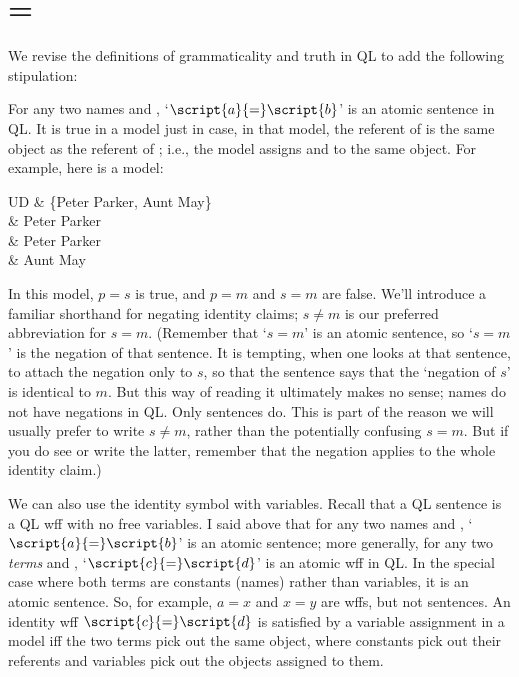 \section{=}

We revise the definitions of grammaticality and truth in QL to add the following stipulation:

For any two names  and , `$\script{a}{=}\script{b}$' is an atomic sentence in QL. It is true in a model just in case, in that model, the referent of  is the same object as the referent of ; i.e., the model assigns  and  to the same object. For example, here is a model:

\begin{partialmodel}
	UD & \{Peter Parker, Aunt May\}\\
	 & Peter Parker\\
	 & Peter Parker\\
	 & Aunt May
\end{partialmodel}

In this model, $p{=}s$ is true, and $p{=}m$ and $s{=}m$ are false. We'll introduce a familiar shorthand for negating identity claims; $s {\neq} m$ is our preferred abbreviation for \enot $s{=}m$. (Remember that `$s{=}m$' is an atomic sentence, so `\enot $s {=} m$' is the negation of that sentence. It is tempting, when one looks at that sentence, to attach the negation only to $s$, so that the sentence says that the `negation of $s$' is identical to $m$. But this way of reading it ultimately makes no sense; names do not have negations in QL. Only sentences do. This is part of the reason we will usually prefer to write $s {\neq} m$, rather than the potentially confusing \enot $s{=}m$. But if you do see or write the latter, remember that the negation applies to the whole identity claim.)

We can also use the identity symbol with variables. Recall that a QL sentence is a QL wff with no free variables. I said above that for any two names  and , `$\script{a}{=}\script{b}$' is an atomic sentence; more generally, for any two \emph{terms}  and , `$\script{c}{=}\script{d}$' is an atomic wff in QL. In the special case where both terms are constants (names) rather than variables, it is an atomic sentence. So, for example,  $a{=}x$ and  $x{=}y$ are wffs, but not sentences. An identity wff $\script{c}{=}\script{d}$ is satisfied by a variable assignment in a model iff the two terms pick out the same object, where constants pick out their referents and variables pick out the objects assigned to them.

